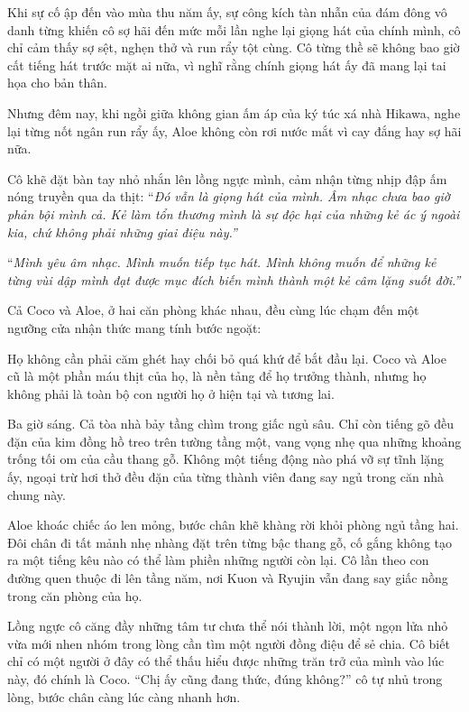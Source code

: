 ﻿\documentclass[../main.tex]{subfiles}
\begin{document}
Khi sự cố ập đến vào mùa thu năm ấy, sự công kích tàn nhẫn của đám đông vô danh từng khiến cô sợ hãi đến mức mỗi lần nghe lại giọng hát của chính mình, cô chỉ cảm thấy sợ sệt, nghẹn thở và run rẩy tột cùng. Cô từng thề sẽ không bao giờ cất tiếng hát trước mặt ai nữa, vì nghĩ rằng chính giọng hát ấy đã mang lại tai họa cho bản thân.

Nhưng đêm nay, khi ngồi giữa không gian ấm áp của ký túc xá nhà Hikawa, nghe lại từng nốt ngân run rẩy ấy, Aloe không còn rơi nước mắt vì cay đắng hay sợ hãi nữa.

Cô khẽ đặt bàn tay nhỏ nhắn lên lồng ngực mình, cảm nhận từng nhịp đập ấm nóng truyền qua da thịt: ``\textit{Đó vẫn là giọng hát của mình. Âm nhạc chưa bao giờ phản bội mình cả. Kẻ làm tổn thương mình là sự độc hại của những kẻ ác ý ngoài kia, chứ không phải những giai điệu này.''}

``\textit{Mình yêu âm nhạc. Mình muốn tiếp tục hát. Mình không muốn để những kẻ từng vùi dập mình đạt được mục đích biến mình thành một kẻ câm lặng suốt đời.''}

Cả Coco và Aloe, ở hai căn phòng khác nhau, đều cùng lúc chạm đến một ngưỡng cửa nhận thức mang tính bước ngoặt:

Họ không cần phải căm ghét hay chối bỏ quá khứ để bắt đầu lại. Coco và Aloe cũ là một phần máu thịt của họ, là nền tảng để họ trưởng thành, nhưng họ không phải là toàn bộ con người họ ở hiện tại và tương lai.

\ct

Ba giờ sáng. Cả tòa nhà bảy tầng chìm trong giấc ngủ sâu. Chỉ còn tiếng gõ đều đặn của kim đồng hồ treo trên tường tầng một, vang vọng nhẹ qua những khoảng trống tối om của cầu thang gỗ. Không một tiếng động nào phá vỡ sự tĩnh lặng ấy, ngoại trừ hơi thở đều đặn của từng thành viên đang say ngủ trong căn nhà chung này.

Aloe khoác chiếc áo len mỏng, bước chân khẽ khàng rời khỏi phòng ngủ tầng hai. Đôi chân đi tất mảnh nhẹ nhàng đặt trên từng bậc thang gỗ, cố gắng không tạo ra một tiếng kêu nào có thể làm phiền những người còn lại. Cô lần theo con đường quen thuộc đi lên tầng năm, nơi Kuon và Ryujin vẫn đang say giấc nồng trong căn phòng của họ.

Lồng ngực cô căng đầy những tâm tư chưa thể nói thành lời, một ngọn lửa nhỏ vừa mới nhen nhóm trong lòng cần tìm một người đồng điệu để sẻ chia. Cô biết chỉ có một người ở đây có thể thấu hiểu được những trăn trở của mình vào lúc này, đó chính là Coco. ``Chị ấy cũng đang thức, đúng không?'' cô tự nhủ trong lòng, bước chân càng lúc càng nhanh hơn.
\end{document}
